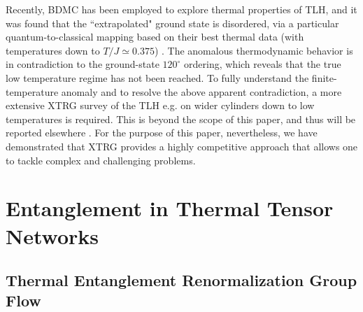 \documentclass[aps,prx,twocolumn,showpacs,psfig,superscriptaddress,longbibliography]{revtex4-1}
\begin{document}
 {Recently, BDMC has been employed to explore thermal properties of TLH, and it was found that the ``extrapolated" ground state is disordered, via a particular quantum-to-classical mapping based on their best thermal data (with temperatures down to $T/J\simeq0.375$) \cite{Kulagin2013}. The anomalous thermodynamic behavior is in contradiction to the ground-state $120^{\circ}$ ordering, which reveals that the true low temperature regime has not been reached. %
To fully understand the finite-temperature anomaly and to resolve the above apparent contradiction, %
a more extensive XTRG survey of the TLH %
e.g. on wider cylinders down to low temperatures is required.
This is beyond the scope of this paper, and thus %
will be reported elsewhere \cite{TrianLatt2018}.
For the purpose of this paper, nevertheless, we have
demonstrated that XTRG provides a highly competitive approach
that allows one to tackle complex and challenging problems.
}


\section{Entanglement in Thermal Tensor Networks}
\label{Sec:TTNE}

\subsection{Thermal Entanglement Renormalization Group Flow}
\end{document}
